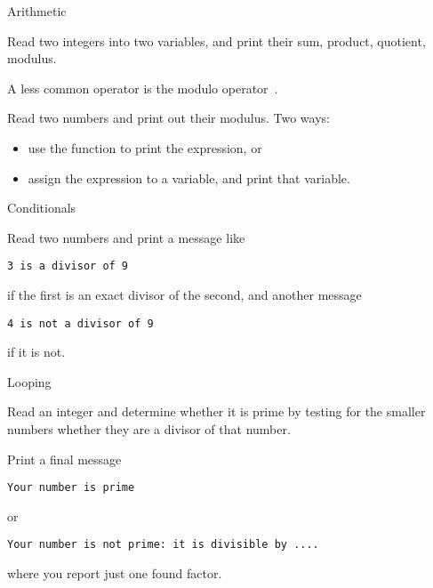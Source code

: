 
 {Arithmetic}

\prerequisite{\ref{sec:expr}}

\begin{exercise}
  \label{ex:prime:sum}
  Read two integers into two variables, and print their sum, product,
  quotient, modulus.
  

\end{exercise}

A less common operator is the modulo operator~.

\begin{exercise}
  \label{ex:prime:modvar}
  Read two numbers and print out their modulus. Two ways:
  \begin{itemize}
  \item use the  function to print the expression, or
  \item assign the expression to a variable, and print that variable.
  \end{itemize}
\end{exercise}

 {Conditionals}

\prerequisite{\ref{sec:if}}

\begin{exercise}
  \label{ex:prime:divtest}
  Read two numbers and print a message like
\begin{verbatim}
3 is a divisor of 9
\end{verbatim}
  if the first is an exact
  divisor of the second, and another message
\begin{verbatim}
4 is not a divisor of 9
\end{verbatim}
if it is not.
\end{exercise}

 {Looping}

\prerequisite{\ref{sec:for}}

\begin{exercise}
  \label{ex:prime:test}
  Read an integer and determine whether it is prime by testing for the
  smaller numbers whether they are a
  divisor of that number. 

  Print a final message
\begin{verbatim}
Your number is prime
\end{verbatim}
or
\begin{verbatim}
Your number is not prime: it is divisible by ....
\end{verbatim}
where you report just one found factor.
\end{exercise}

